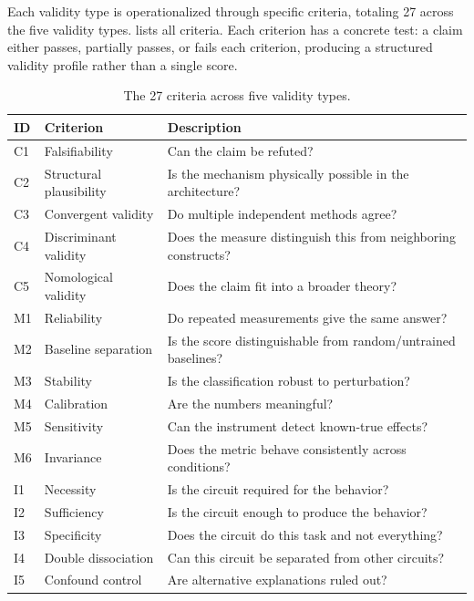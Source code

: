 \documentclass[10pt]{article}
\begin{document}
Each validity type is operationalized through specific criteria, totaling 27 across the five validity types.  lists all criteria. Each criterion has a concrete test: a claim either passes, partially passes, or fails each criterion, producing a structured validity profile rather than a single score.

\begingroup
{}
\begin{table}[H]
\centering
\small
\caption{The 27 criteria across five validity types.}
\label{tab:criteria}
\renewcommand{\arraystretch}{1.15}
\begin{tabular}{@{}llp{8.5cm}@{}}
\toprule
\textbf{ID} & \textbf{Criterion} & \textbf{Description} \\
\midrule
C1 & Falsifiability & Can the claim be refuted? \\
C2 & Structural plausibility & Is the mechanism physically possible in the architecture? \\
C3 & Convergent validity & Do multiple independent methods agree? \\
C4 & Discriminant validity & Does the measure distinguish this from neighboring constructs? \\
C5 & Nomological validity & Does the claim fit into a broader theory? \\
\midrule
M1 & Reliability & Do repeated measurements give the same answer? \\
M2 & Baseline separation & Is the score distinguishable from random/untrained baselines? \\
M3 & Stability & Is the classification robust to perturbation? \\
M4 & Calibration & Are the numbers meaningful? \\
M5 & Sensitivity & Can the instrument detect known-true effects? \\
M6 & Invariance & Does the metric behave consistently across conditions? \\
\midrule
I1 & Necessity & Is the circuit required for the behavior? \\
I2 & Sufficiency & Is the circuit enough to produce the behavior? \\
I3 & Specificity & Does the circuit do this task and not everything? \\
I4 & Double dissociation & Can this circuit be separated from other circuits? \\
I5 & Confound control & Are alternative explanations ruled out? \\

\end{tabular}
\end{table}
\end{document}
